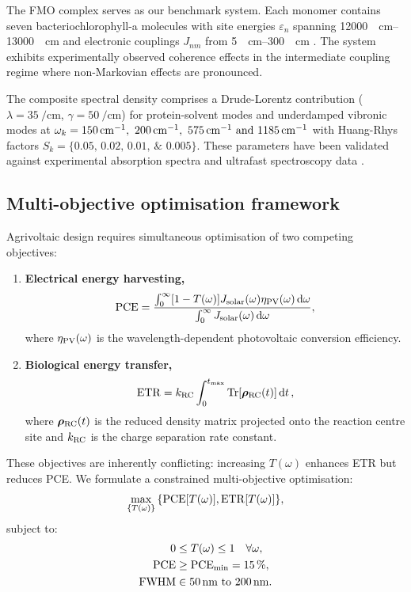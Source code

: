 The FMO complex serves as our benchmark system. Each monomer contains seven bacteriochlorophyll-a molecules with site energies $\varepsilon_n$ spanning \SIrange{12000}{13000}{\per\cm} and electronic couplings $J_{nm}$ from \SIrange{5}{300}{\per\cm} \cite{Adolphs2006}. The system exhibits experimentally observed coherence effects \cite{Engel2007} in the intermediate coupling regime where non-Markovian effects are pronounced.

The composite spectral density comprises a Drude-Lorentz contribution ($\lambda = \SI{35}{\per\cm}$, $\gamma = \SI{50}{\per\cm}$) for protein-solvent modes and underdamped vibronic modes at $\omega_k = \SIlist{150;200;575;1185}{\per\cm}$ with Huang-Rhys factors $S_k = \{\numlist{0.05; 0.02; 0.01; 0.005}\}$. These parameters have been validated against experimental absorption spectra and ultrafast spectroscopy data \cite{Adolphs2006, Moix2011}.

\subsection{Multi-objective optimisation framework}

Agrivoltaic design requires simultaneous optimisation of two competing objectives:
\begin{enumerate}
\item \textbf{Electrical energy harvesting,}
\begin{equation}\label{eq:PCE}
\mathrm{PCE} = \frac{\int_0^\infty [1-T(\omega)] J_{\rm solar}(\omega) \eta_{\rm PV}(\omega) \dd{\omega}}{\int_0^\infty J_{\rm solar}(\omega) \dd{\omega}},
\end{equation}
where $\eta_{\rm PV}(\omega)$ is the wavelength-dependent photovoltaic conversion efficiency.

\item \textbf{Biological energy transfer,}
\begin{equation}\label{eq:ETR}
\mathrm{ETR} = k_{\rm RC} \int_0^{t_{\rm max}} \Tr[\bm{\rho}_{\rm RC}(t)] \dd{t},
\end{equation}
where $\bm{\rho}_{\rm RC}(t)$ is the reduced density matrix projected onto the reaction centre site and $k_{\rm RC}$ is the charge separation rate constant.
\end{enumerate}

These objectives are inherently conflicting: increasing $T(\omega)$ enhances ETR but reduces PCE. We formulate a constrained multi-objective optimisation:
\begin{equation}\label{eq:pareto_optimization}
\max_{\{T(\omega)\}} \qty{ \mathrm{PCE}[T(\omega)], \mathrm{ETR}[T(\omega)] },
\end{equation}
subject to:
\begin{align}
0 &\leq T(\omega) \leq 1 \quad \forall \omega, \label{eq:constraint1}\\
\mathrm{PCE} &\geq \mathrm{PCE}_{\rm min} = \SI{15}{\percent}, \label{eq:constraint2}\\
\mathrm{FWHM} &\in \SIrange{50}{200}{\nano\meter}. \label{eq:constraint3}
\end{align}

